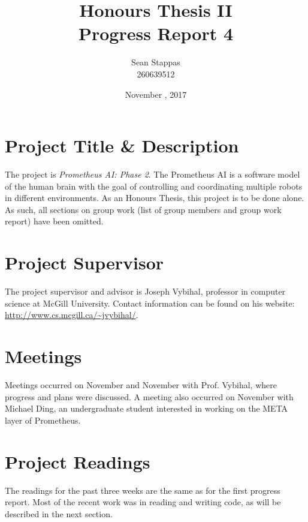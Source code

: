 \documentclass[]{article}
\title{\textbf{Honours Thesis II \\ Progress Report 4}}
\author{Sean Stappas \\ 260639512}
\date{November \nth{15}, 2017}
\begin{document}
	\maketitle
	
	\section{Project Title \& Description}
	
	The project is \emph{Prometheus AI: Phase 2}. The Prometheus AI is a software model of the human brain with the goal of controlling and coordinating multiple robots in different environments. As an Honours Thesis, this project is to be done alone. As such, all sections on group work (list of group members and group work report) have been omitted.
	
	\section{Project Supervisor}
	
	The project supervisor and advisor is Joseph Vybihal, professor in computer science at McGill University. Contact information can be found on his website: \url{http://www.cs.mcgill.ca/~jvybihal/}.
	
	\section{Meetings}
	
	Meetings occurred on November  and November  with Prof. Vybihal, where progress and plans were discussed. A meeting also occurred on November  with Michael Ding, an undergraduate student interested in working on the META layer of Prometheus.
	
	\section{Project Readings} \label{sec:readings}
	
	The readings for the past three weeks are the same as for the first progress report. Most of the recent work was in reading and writing code, as will be described in the next section.
	
\end{document}

